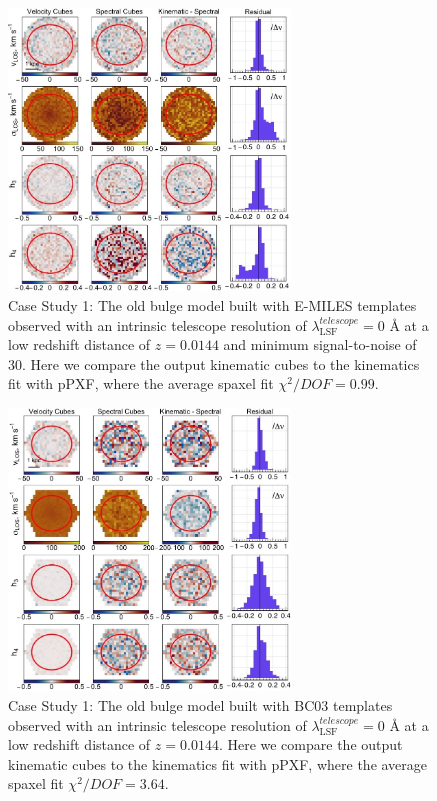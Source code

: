 \documentclass[
  journal=pasa,
  manuscript=research-paper, %
  year=2020,
  volume=37,
]{cup-journal}
\begin{document}
\begin{figure}
    \centering
    \includegraphics[keepaspectratio, width=7.5cm]{cs1_old_bulge_velocities_lowz_EMILES.jpeg}
    \caption{Case Study 1: The old bulge model built with E-MILES templates observed with an intrinsic telescope resolution of  $\lambda_{\text{LSF}}^{telescope} = 0$ \AA{} at a low redshift distance of $z = 0.0144$ and minimum signal-to-noise of 30. Here we compare the output kinematic cubes to the kinematics fit with pPXF, where the average spaxel fit $\chi^2/DOF = 0.99$.}
    \label{fig:cs1_oldbulge_E-MILES}
\end{figure}

\begin{figure}
    \centering
    \includegraphics[keepaspectratio, width=7.5cm]{cs1_old_bulge_velocities_lowz_BC03hr.jpeg}
    \caption{Case Study 1: The old bulge model built with BC03 templates observed with an intrinsic telescope resolution of  $\lambda_{\text{LSF}}^{telescope} = 0$ \AA{} at a low redshift distance of $z = 0.0144$. Here we compare the output kinematic cubes to the kinematics fit with pPXF, where the average spaxel fit $\chi^2/DOF = 3.64$.}
    \label{fig:cs1_oldbulge_BC03}
\end{figure}
\end{document}

